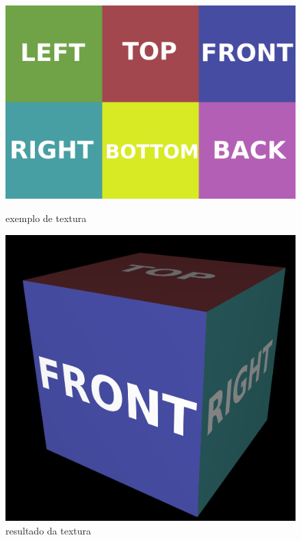 \documentclass[a4paper]{report}
\begin{document}
\begin{figure}[H]
    \centering
    \begin{minipage}{0.39\textwidth}
        \centering
        \includegraphics[width=\textwidth]{images/test_cube.jpg}
        \caption{exemplo de textura}
    \end{minipage}\hfill
    \begin{minipage}{0.59\textwidth}
        \centering
        \includegraphics[width=\textwidth]{images/test_cube_rendered.png}
        \caption{resultado da textura}
    \end{minipage}\hfill
\end{figure}
\end{document}
